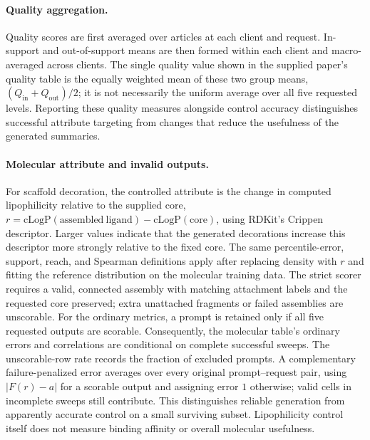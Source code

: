 \documentclass[11pt]{article}
\begin{document}
\paragraph{Quality aggregation.}
Quality scores are first averaged over articles at each client and request. In-support and out-of-support means are then formed within each client and macro-averaged across clients. The single quality value shown in the supplied paper's quality table is the equally weighted mean of these two group means, $(Q_{\mathrm{in}}+Q_{\mathrm{out}})/2$; it is not necessarily the uniform average over all five requested levels. Reporting these quality measures alongside control accuracy distinguishes successful attribute targeting from changes that reduce the usefulness of the generated summaries.

\paragraph{Molecular attribute and invalid outputs.}
For scaffold decoration, the controlled attribute is the change in computed lipophilicity relative to the supplied core, $r=\mathrm{cLogP}(\mathrm{assembled\ ligand})-\mathrm{cLogP}(\mathrm{core})$, using RDKit's Crippen descriptor. Larger values indicate that the generated decorations increase this descriptor more strongly relative to the fixed core. The same percentile-error, support, reach, and Spearman definitions apply after replacing density with $r$ and fitting the reference distribution on the molecular training data. The strict scorer requires a valid, connected assembly with matching attachment labels and the requested core preserved; extra unattached fragments or failed assemblies are unscorable. For the ordinary metrics, a prompt is retained only if all five requested outputs are scorable. Consequently, the molecular table's ordinary errors and correlations are conditional on complete successful sweeps. The unscorable-row rate records the fraction of excluded prompts. A complementary failure-penalized error averages over every original prompt--request pair, using $|F(r)-a|$ for a scorable output and assigning error $1$ otherwise; valid cells in incomplete sweeps still contribute. This distinguishes reliable generation from apparently accurate control on a small surviving subset. Lipophilicity control itself does not measure binding affinity or overall molecular usefulness.
\end{document}
